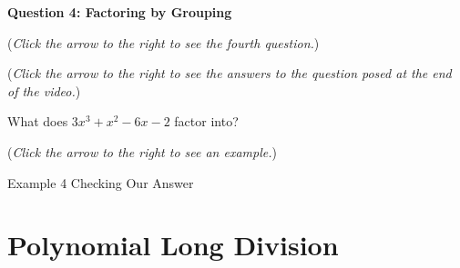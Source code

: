 \documentclass{ximera}
\begin{document}
\textbf{Question 4: Factoring by Grouping}
\begin{question}
\begin{flushright}
{\color{blue}(\emph{Click the arrow to the right to see the fourth question.})}
\end{flushright}
\begin{center}
\begin{expandable}
{\color{blue}(\emph{Click the arrow to the right to see the answers 
to the question posed at the end of the video.})}
\begin{expandable}
What does $3x^3+x^2-6x-2$ factor into?
\begin{multipleChoice}
\end{multipleChoice}
\begin{flushright}
{\color{blue}(\emph{Click the arrow to the right to see an example.})}
\end{flushright}
\begin{expandable}
Example 4
Checking Our Answer %
\end{expandable}
\end{expandable}
\end{expandable}
\end{center}
\end{question}


\section{Polynomial Long Division}
\end{document}
